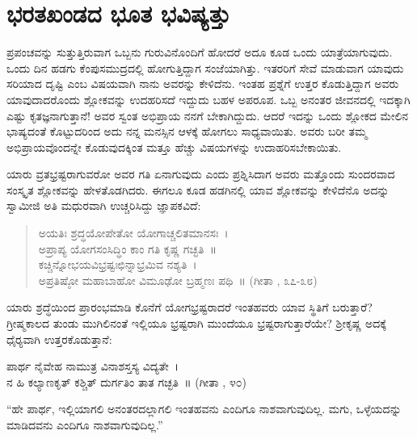 \section*{ಭರತಖಂಡದ ಭೂತ ಭವಿಷ್ಯತ್ತು}

 ಪ್ರಪಂಚವನ್ನು ಸುತ್ತುತ್ತಿರುವಾಗ ಒಬ್ಬನು ಗುರುವಿನೊಂದಿಗೆ ಹೋದರೆ ಅದೂ ಕೂಡ ಒಂದು ಯಾತ್ರೆಯಾಗುವುದು. ಒಂದು ದಿನ ಹಡಗು ಕೆಂಪುಸಮುದ್ರದಲ್ಲಿ ಹೋಗುತ್ತಿದ್ದಾಗ ಸಂಜೆಯಾಗಿತ್ತು. ಇತರರಿಗೆ ಸೇವೆ ಮಾಡುವಾಗ ಯಾವುದು ಸರಿಯಾದ ದೃಷ್ಟಿ ಎಂಬ ವಿಷಯವಾಗಿ ನಾನು ಅವರನ್ನು ಕೇಳಿದೆನು. ಇಂತಹ ಪ್ರಶ್ನೆಗೆ ಉತ್ತರ ಕೊಡುತ್ತಿದ್ದಾಗ ಅವರು ಯಾವುದಾದರೊಂದು ಶ್ಲೋಕವನ್ನು ಉದಹರಿಸದೆ ಇದ್ದುದು ಬಹಳ ಅಪರೂಪ. ಒಬ್ಬ ಅನಂತರ ಜೀವನದಲ್ಲಿ ಇದಕ್ಕಾಗಿ ಎಷ್ಟು ಕೃತಜ್ಞನಾಗುತ್ತಾನೆ! ಅವರ ಸ್ವಂತ ಅಭಿಪ್ರಾಯ ನನಗೆ ಬೇಕಾಗಿದ್ದುದು. ಆದರೆ ಇದನ್ನು ಒಂದು ಶ್ಲೋಕದ ಮೇಲಿನ ಭಾಷ್ಯದಂತೆ ಕೊಟ್ಟುದರಿಂದ ಅದು ನನ್ನ ಮನಸ್ಸಿನ ಆಳಕ್ಕೆ ಹೋಗಲು ಸಾಧ್ಯವಾಯಿತು. ಅವರು ಬರೀ ತಮ್ಮ ಅಭಿಪ್ರಾಯವೊಂದನ್ನೇ ಕೊಡುವುದಕ್ಕಿಂತ ಮತ್ತೂ ಹೆಚ್ಚು ವಿಷಯಗಳನ್ನು ಉದಾಹರಿಸಬೇಕಾಯಿತು. 

 ಯಾರು ವ್ರತಭ್ರಷ್ಟರಾಗುವರೋ ಅವರ ಗತಿ ಏನಾಗುವುದು ಎಂದು ಪ್ರಶ್ನಿಸಿದಾಗ ಅವರು ಮತ್ತೊಂದು ಸುಂದರವಾದ ಸಂಸ್ಕೃತ ಶ್ಲೋಕವನ್ನು ಹೇಳತೊಡಗಿದರು. ಈಗಲೂ ಕೂಡ ಹಡಗಿನಲ್ಲಿ ಯಾವ ಶ್ಲೋಕವನ್ನು ಕೇಳಿದೆನೊ ಅದನ್ನು ಸ್ವಾಮೀಜಿ ಅತಿ ಮಧುರವಾಗಿ ಉಚ್ಚರಿಸಿದ್ದು ಜ್ಞಾಪಕವಿದೆ:

\begin{verse}
ಅಯತಿಃ ಶ್ರದ್ಧಯೋಪೇತೋ ಯೋಗಾಚ್ಚಲಿತಮಾನಸಃ~।\\ಅಪ್ರಾಪ್ಯ ಯೋಗಸಂಸಿದ್ಧಿಂ ಕಾಂ ಗತಿ ಕೃಷ್ಣ ಗಚ್ಛತಿ~॥\\ಕಚ್ಚಿನ್ನೋಭಯವಿಭ್ರಷ್ಟಃಛಿನ್ನಾಭ್ರಮಿವ ನಶ್ಯತಿ~।\\ಅಪ್ರತಿಷ್ಠೋ ಮಹಾಬಾಹೋ ವಿಮೂಢೋ ಬ್ರಹ್ಮಣಃ ಪಥಿ~॥ (ಗೀತಾ , ೩೭-೩೮)
\end{verse}

 ಯಾರು ಶ್ರದ್ಧೆಯಿಂದ ಪ್ರಾರಂಭಮಾಡಿ ಕೊನೆಗೆ ಯೋಗಭ್ರಷ್ಟರಾದರೆ ಇಂತಹವರು ಯಾವ ಸ್ಥಿತಿಗೆ ಬರುತ್ತಾರೆ? ಗ್ರೀಷ್ಮಕಾಲದ ತುಂಡು ಮುಗಿಲಿನಂತೆ ಇಲ್ಲಿಯೂ ಭ್ರಷ್ಟರಾಗಿ ಮುಂದೆಯೂ ಭ್ರಷ್ಟರಾಗುತ್ತಾರೆಯೇ? ಶ‍್ರೀಕೃಷ್ಣ ಅದಕ್ಕೆ ಧೈರ‍್ಯವಾಗಿ ಉತ್ತರಕೊಡುತ್ತಾನೆ: 

ಪಾರ್ಥ ನೈವೇಹ ನಾಮುತ್ರ ವಿನಾಶಸ್ತಸ್ಯ ವಿದ್ಯತೇ~। \\ನ ಹಿ ಕಲ್ಯಾಣಕೃತ್ ಕಶ್ಚಿತ್ ದುರ್ಗತಿಂ ತಾತ ಗಚ್ಛತಿ~॥ (ಗೀತಾ , ೪೦)

 “ಹೇ ಪಾರ್ಥ, ಇಲ್ಲಿಯಾಗಲಿ ಅನಂತರದಲ್ಲಾಗಲಿ ಇಂತಹವನು ಎಂದಿಗೂ ನಾಶವಾಗುವುದಿಲ್ಲ. ಮಗು, ಒಳ್ಳೆಯದನ್ನು ಮಾಡಿದವನು ಎಂದಿಗೂ ನಾಶವಾಗುವುದಿಲ್ಲ.” 

